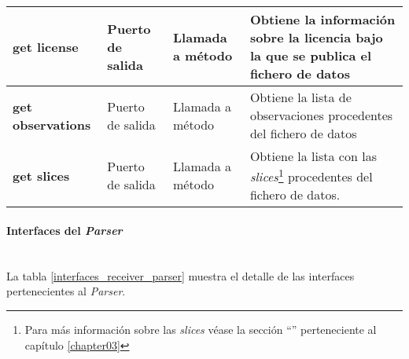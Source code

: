 \begin{longtable}[c]{|p{25mm}|p{20mm}|p{30mm}|p{60mm}|}
   	\textbf{get license} & Puerto de salida & Llamada a método & Obtiene la información sobre la licencia bajo la que se publica el fichero de datos \\
   	\hline
   	
   	\textbf{get observations} & Puerto de salida & Llamada a método & Obtiene la lista de observaciones procedentes del fichero de datos \\
   	\hline
   	
   	\textbf{get slices} & Puerto de salida & Llamada a método & Obtiene la lista con las \textit{slices}\footnote{Para más información sobre las \textit{slices} véase la sección ``\nameref{\label{concept:rdf_data_cube}}'' perteneciente al capítulo \ref{chapter03}} procedentes del fichero de datos. \\
   	\hline
\hline
\hline
 
\end{longtable}


\paragraph{Interfaces del \textit{Parser}} \hfill \\
La tabla \ref{interfaces_receiver_parser} muestra el detalle de las interfaces pertenecientes al \textit{Parser}.


